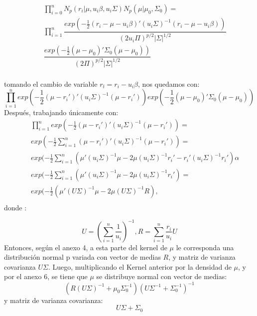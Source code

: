 \begin{eqnarray*}
& &\prod_{i=0}^{n}N_{p}(r_{i}|\mu,u_{i}\beta,u_{i}\Sigma)N_{p}(\mu|\mu_{0},\Sigma_{0})=
 \\
& & \prod_{i=1}^{n}\dfrac{exp(-\frac{1}{2}(r_{i}-\mu-u_{i}\beta)'(u_{i}\Sigma)^{-1}(r_{i}-\mu-u_{i}\beta))}{(2u_{i}\Pi)^{p/2}|\Sigma|^{1/2}}\\
& & \dfrac{exp(-\frac{1}{2}(\mu-\mu_{0})'\Sigma_{0}(\mu-\mu_{0}))}{(2\Pi)^{p/2}|\Sigma|^{1/2}}\\
\end{eqnarray*}

tomando el cambio de variable  $r_{i}\acute{}=r_{i}-u_{i}\beta$, nos quedamos con:
 \begin{equation*}
 \prod_{i=1}^{n}exp(-\frac{1}{2}(\mu-r_{i}')'(u_{i}\Sigma)^{-1}(\mu-r_{i}'))exp(-\dfrac{1}{2}(\mu-\mu_{0})'\Sigma_{0}(\mu-\mu_{0}))
 \end{equation*}
Después, trabajando únicamente con:
\begin{eqnarray*}
& &\prod_{i=1}^{n}exp(-\frac{1}{2}(\mu-r_{i}')'(u_{i}\Sigma)^{-1}(\mu-r_{i}'))=
 \\
& & exp(-\frac{1}{2}\sum_{i=1}^{n}(\mu-r_{i}')'(u_{i}\Sigma)^{-1}(\mu-r_{i}')) = \\
& &exp(-\frac{1}{2}\sum_{i=1}^{n}(\mu'(u_{i}\Sigma)^{-1}\mu  -2\mu(u_{i}\Sigma)^{-1}r_{i}' -r_{i}'(u_{i}\Sigma)^{-1}r_{i}' )\alpha 
 \\
& &  exp(-\frac{1}{2}\sum_{i=1}^{n}(\mu'(u_{i}\Sigma)^{-1}\mu  -2\mu(u_{i}\Sigma)^{-1}r_{i}')= \\
& & 
exp(-\frac{1}{2}(\mu'(U\Sigma)^{-1}\mu  -2\mu(U\Sigma)^{-1}R), \\
\end{eqnarray*}
donde : 

\begin{equation*}
U=(\sum_{i=1}^{n}\dfrac{1}{u_{i}})^{-1}, R= \sum_{i=1}^{n}\dfrac{r_{i}}{u_{i}}U
\end{equation*}
Entonces, según el anexo 4, a esta parte del kernel de $\mu$ le corresponda una distribución normal p variada con vector de medias $R$, y matriz de varianza covarianza $U\Sigma$. Luego, multiplicando el Kernel anterior por la densidad de $\mu$, y por el anexo 6, se tiene que $\mu$ se distribuye normal con vector de medias:
\begin{equation*}
(R(U\Sigma)^{-1}+\mu_{0}\Sigma_{0}^{-1})(U\Sigma^{-1}+\Sigma_{0}^{-1})^{-1}
\end{equation*}
 y matriz de varianza covarianza:
 \begin{equation*}
 U\Sigma+\Sigma_{0}
 \end{equation*}

